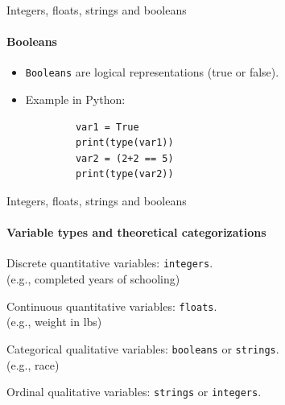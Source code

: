 \documentclass[notes,11pt, aspectratio=169, xcolor=table]{beamer}
\begin{document}
    \begin{frame}[fragile=singleslide]{Integers, floats, strings and booleans}
    \framesubtitle{Booleans}

        \begin{itemize}
            \item \texttt{Booleans} are logical representations (true or false).
            \item Example in Python:
        \end{itemize}

        \begin{verbatim}
            var1 = True
            print(type(var1))
            var2 = (2+2 == 5)
            print(type(var2))
        \end{verbatim}    
   
    \end{frame}    

    \begin{frame}[fragile=singleslide]{Integers, floats, strings and booleans}
    \framesubtitle{Variable types and theoretical categorizations}

        \begin{wide}
            \item Discrete quantitative variables: \texttt{integers}. \\
            \qquad (e.g., completed years of schooling)
            \item Continuous quantitative variables: \texttt{floats}. \\
            \qquad (e.g., weight in lbs)
            \item Categorical qualitative variables: \texttt{booleans} or \texttt{strings}. \\
            \qquad (e.g., race)
            \item Ordinal qualitative variables: \texttt{strings} or \texttt{integers}.
        \end{wide}
    \end{frame}    
    
\end{document}
